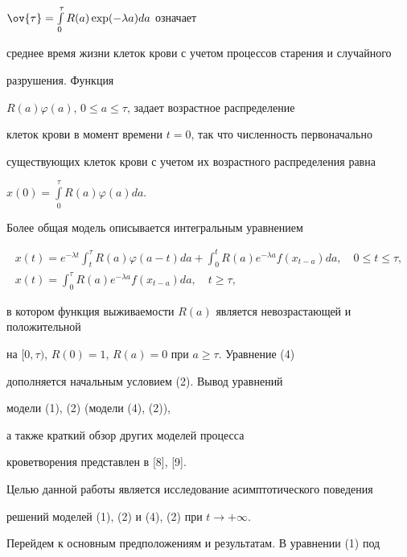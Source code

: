 $\ov{\tau}=\int\limits_{0}^{\tau} R(a) \exp(- \lambda a) da$ означает


среднее время жизни клеток крови с учетом процессов старения и случайного


разрушения. Функция


$R(a) \varphi(a)$, $0 \leq a \leq \tau$, задает возрастное распределение


клеток крови в момент времени $t=0$, так что численность первоначально


существующих клеток крови с учетом их возрастного распределения равна


$x(0)=\int\limits_{0}^{\tau} R(a) \varphi(a) da$.





Более общая модель описывается интегральным уравнением


\begin{gather}


x(t)=e^{ - \lambda t} \int_{t}^{\tau} R(a) \varphi(a-t)da+


\int_{0}^{t} R(a) e^{- \lambda a} f(x_{t-a})da,


\quad 0 \leq t \leq \tau,  \tag{4a} \\


%


x(t)=\int_{0}^{\tau} R(a) e^{- \lambda a} f(x_{t-a})da,


\quad t \geq \tau, \tag{4b}


\end{gather}


\addtocounter{equation}{1}


в котором функция выживаемости $R(a)$ является невозрастающей и положительной


на $[0, \tau)$, $R(0)=1$, $R(a)=0$ при $a \geq \tau$. Уравнение (4)


дополняется начальным условием (2). Вывод уравнений


модели (1), (2) (модели (4), (2)),


а также краткий обзор других моделей процесса


кроветворения представлен в [8], [9].


Целью данной работы является исследование асимптотического поведения


решений моделей (1), (2) и (4), (2) при $t \to+\infty$.





Перейдем к основным предположениям и результатам. В уравнении (1) под


